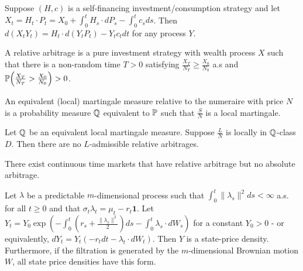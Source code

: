 \begin{thm}
  \label{sec:arbitr-theory-cont-1}
  Suppose $(H, c)$ is a self-financing investment/consumption strategy
  and let $X_{t} = H_{t} \cdot P_{t} = X_{0} + \int_{0}^{t} H_{s}
  \cdot dP_{s} - \int_{0}^{t} c_{s} ds$.  Then $d(X_{t} Y_{t}) = H_{t}
  \cdot d(Y_{t} P_{t}) - Y_{t} c_{t} dt$ for any \ito process $Y$.
\end{thm}

\begin{defn}
  \label{sec:arbitr-theory-cont-10}
  A relative arbitrage is a pure investment strategy with wealth
  process $X$ such that there is a non-random time $T > 0$ satisfying
  $\frac{X_{T}}{N_{T}} \geq \frac{X_{0}}{N_{0}}$ a.s and
  $\Prob{\frac{X_{T}}{N_{T}} > \frac{X_{0}}{N_{0}}} > 0$.
\end{defn}

\begin{defn}
  \label{sec:arbitr-theory-cont-11}
  An equivalent (local) martingale measure relative to the numeraire
  with price $N$ is a probability measure $\Q$ equivalent to $\Prob$ such
  that $\frac{S}{N}$ is a local martingale.
\end{defn}

\begin{thm}
  \label{sec:arbitr-theory-cont-12}
  Let $\Q$ be an equivalent local martingale measure.  Suppose
  $\frac{L}{N}$ is locally in $\Q$-class $D$.  Then there are no
  $L$-admissible relative arbitrages.
\end{thm}

\begin{thm}
  \label{sec:arbitr-theory-cont-13}
  There exist continuous time markets that have relative arbitrage but
  no absolute arbitrage.
\end{thm}

\begin{thm}
  \label{sec:arbitr-theory-cont-14}
  Let $\lambda$ be a predictable $m$-dimensional process such that
  $\int_{0}^{t} \| \lambda_{s} \|^{2}ds < \infty$ a.s. for all $t \geq
  0$ and that $\sigma_{t} \lambda_{t} = \mu_{t} - r_{t} \mathbf{1}$.
  Let $Y_{t} = Y_{0} \exp(-\int_{0}^{t} (r_{s} + \frac{\|
    \lambda_{s}\|^{2}}{2}) ds - \int_{0}^{t} \lambda_{s} \cdot
  dW_{s})$ for a constant $Y_{0} > 0$ - or equivalently, $dY_{t} =
  Y_{t}(-r_{t} dt - \lambda_{t} \cdot dW_{t})$.  Then $Y$ is a
  state-price density.  Furthermore, if the filtration is generated by
  the $m$-dimensional Brownian motion $W$, all state price densities
  have this form.
\end{thm}

